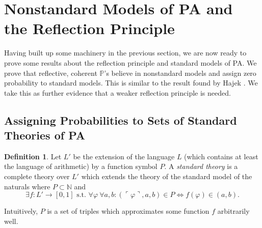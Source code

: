 \documentclass[12pt]{article}
\newcommand{\PP}{\mathbb{P}}
\newcommand{\vp}{\varphi}
\theoremstyle{plain}
\theoremstyle{definition}
\newtheorem{definition}[theorem]{Definition}
\theoremstyle{remark}
\begin{document}
\section{Nonstandard Models of PA and the Reflection Principle}
\label{nonstandard-models}
Having built up some machinery in the previous section, we are now ready to prove some results about the reflection principle and standard models of PA. We prove that reflective, coherent $\PP$'s believe
in nonstandard models and assign zero probability to standard models. This is similar to the result found by Hajek \cite{hajek98}. We take this as further evidence that a weaker reflection principle is needed.
\subsection{Assigning Probabilities to Sets of Standard Theories of PA}
\begin{definition}
Let $L'$ be the extension of the language $L$ (which contains at least the language of arithmetic) by a function symbol $P$. A \emph{standard theory} is a complete theory over $L'$ which extends the theory of the standard model of the naturals where $P\subset\mathbb{N}$ and 
$$\exists f : L'\rightarrow[0, 1] \text{ s.t. } \forall \vp~\forall a, b: (\ulcorner \vp \urcorner, a, b) \in P \iff f(\vp) \in (a, b).$$
\end{definition}
Intuitively, $P$ is a set of triples which approximates some function $f$ arbitrarily well.
\end{document}
